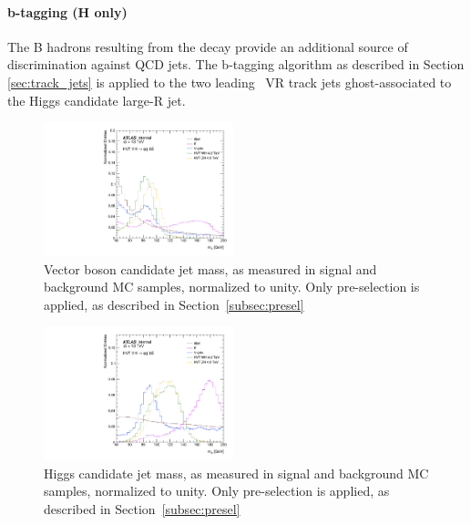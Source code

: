 \paragraph{b-tagging (H only)}
The B hadrons resulting from the \Hbb decay provide an additional source of discrimination against QCD jets.
The b-tagging algorithm as described in Section \ref{sec:track_jets} is applied to the two leading \pt\ VR track jets ghost-associated to the Higgs candidate large-R jet.

\begin{figure}[htbp!]
\begin{center}
    \includegraphics[width=0.49\textwidth]{VHqqbb_SimpleSigBkgMC_mV.pdf}
\end{center}
\caption{Vector boson candidate jet mass, as measured in signal and background MC samples, normalized to unity. Only pre-selection is applied, as described in Section~\ref{subsec:presel}}
\label{fig:simple_mc_mV}
\end{figure}

\begin{figure}[htbp!]
\begin{center}
    \includegraphics[width=0.49\textwidth]{VHqqbb_SimpleSigBkgMC_mH.pdf}
\end{center}
\caption{Higgs candidate jet mass, as measured in signal and background MC samples, normalized to unity. Only pre-selection is applied, as described in Section~\ref{subsec:presel} }
\label{fig:simple_mc_mH}
\end{figure}

